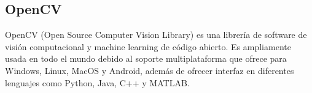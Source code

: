 %
%


\subsection{OpenCV}
\label{sec:opencv}
OpenCV (Open Source Computer Vision Library) es una librería de software de visión computacional y machine learning de código abierto. Es ampliamente usada en todo el mundo debido al soporte multiplataforma que ofrece para Windows, Linux, MacOS y Android, además de ofrecer interfaz en diferentes lenguajes como Python, Java, C++ y MATLAB.\\

